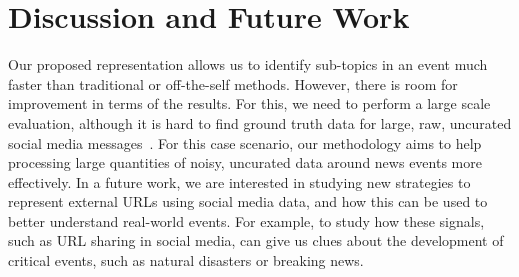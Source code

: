 \section{Discussion and Future Work}\label{sec:conclusions}


Our proposed representation allows us to identify sub-topics in an event much
faster than traditional or off-the-self methods.
%
However, there is room for improvement in terms of the results.
%
For this, we need to perform a large scale evaluation, although it is hard to
find ground truth data for large, raw, uncurated social media
messages~\cite{Alonso:2015:WCW:2740908.2745397}.
%
For this case scenario, our methodology aims to help processing large quantities
of noisy, uncurated data around news events more effectively.
%
In a future work, we are interested in studying new strategies to represent
external URLs using social media data, and how this can be used to better
understand real-world events.
%
For example, to study how these signals, such as URL sharing in social media,
can give us clues about the development of critical events, such as natural
disasters or breaking news.
